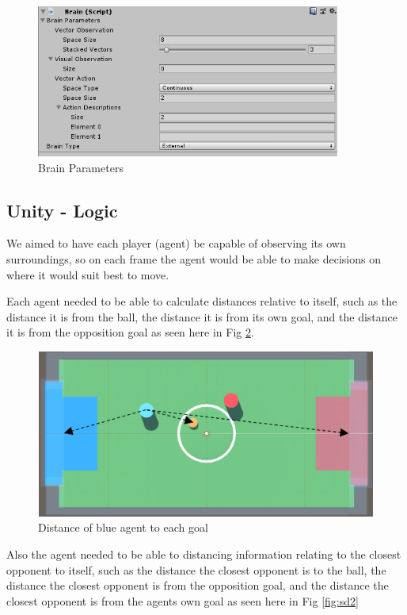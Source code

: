 \begin{figure}[H]
    \centering
    \includegraphics[width=100mm, height=50mm]{img/Brain.PNG}
    \caption{Brain Parameters}
    \label{fig:brain}
\end{figure}


\subsection{Unity - Logic}
\begin{flushleft}
We aimed to have each player (agent) be capable of observing its own surroundings, so on each frame the agent would be able to make decisions on where it would suit best to move.\par
Each agent needed to be able to calculate distances relative to itself, such as the distance it is from the ball, the distance it is from its own goal, and the distance it is from the opposition goal as seen here in Fig \ref{fig:sd1}.
\end{flushleft}

\begin{figure}[H]
    \centering
    \includegraphics[width=115mm, height=55mm]{img/Image1.png}
    \caption{Distance of blue agent to each goal}
    \label{fig:sd1}
\end{figure}

\begin{flushleft}
Also the agent needed to be able to distancing information relating to the closest opponent to itself, such as the distance the closest opponent is to the ball, the distance the closest opponent is from the opposition goal, and the distance the closest opponent is from the agents own goal as seen here in Fig \ref{fig:sd2}
\end{flushleft}

